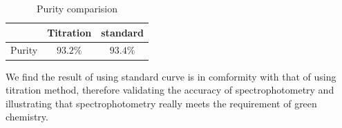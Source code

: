 \begin{table}[H]
	\caption{Purity comparision}
	\label{tab.Res}
	\begin{tabular}{ccc}
	\toprule
		   & Titration & standard\\
	\midrule
	Purity & $93.2\%$  & $93.4\%$\\
	\bottomrule
	\end{tabular}
\end{table}

We find the result of using standard curve is in comformity with that of using titration method, therefore validating the accuracy of spectrophotometry and illustrating that spectrophotometry really meets the requirement of green chemistry.

\ifx\SUM\undefined


\fi